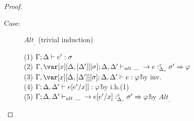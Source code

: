 \begin{proof}
\begin{description}
\item[Case:] $Alt_\_$ (trivial induction)
\begin{tabbing}
    (1) $\Gamma;\Delta \vdash e' : \sigma$\\
    (2) $\G,\xD; \D,\D' \vdash_{alt} \_~\to e :^z_{\D_s} \s' \Rightarrow \vp$\\
    (3) $\G,\xD; \D,\D' \vdash e : \vp$\` by inv.\\
    (4) $\Gamma; \Delta, \Delta' \vdash e[e'/x]] : \varphi$\` by i.h.(1)\\
    (5) $\Gamma; \Delta,\Delta' \vdash_{alt} \_~\to e[e'/x] :^z_{\Delta_s} \sigma' \Rightarrow \varphi$\` by $Alt_\_$\\
\end{tabbing}
\end{description}

\end{proof}

